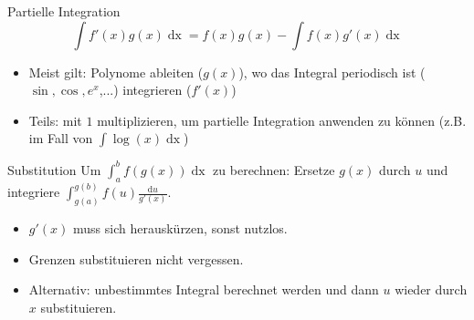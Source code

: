 \documentclass[a4paper,10pt]{article}
\begin{document}
\begin{mainbox}{Partielle Integration}
	\vspace{-12pt}
	$$\int f'(x) g(x) \mathop{dx} = f(x)g(x) - \int f(x) g'(x) \mathop{dx}$$
\end{mainbox}
\begin{itemize}
	\item Meist gilt: Polynome ableiten ($g(x)$), wo das Integral periodisch ist ($\sin, \cos, e^x$,...) integrieren ($f'(x)$)
	\item Teils: mit $1$ multiplizieren, um partielle Integration anwenden zu können (z.B. im Fall von $\int \log(x) \mathop{dx}$)
\end{itemize}
\begin{mainbox}{Substitution}
	Um $\int_a^b f(g(x)) \mathop{dx}$ zu berechnen: Ersetze $g(x)$ durch $u$ und integriere $\int_{g(a)}^{g(b)} f(u) \frac{\text{d}u}{g'(x)}$.
\end{mainbox}
\begin{itemize}
	\item $g'(x)$ muss sich herauskürzen, sonst nutzlos.
	\item Grenzen substituieren nicht vergessen.
	\item Alternativ: unbestimmtes Integral berechnet werden und dann $u$ wieder durch $x$ substituieren.
\end{itemize}
\end{document}
